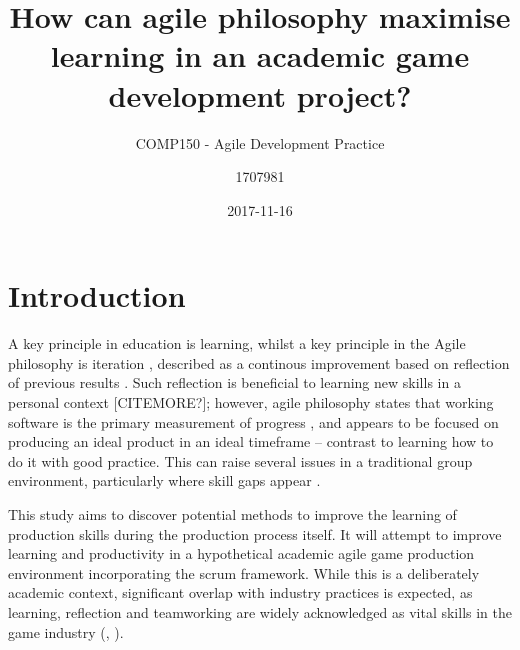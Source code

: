 \documentclass{scrartcl}
\title{How can agile philosophy maximise learning in an academic game development project?}
\subtitle{COMP150 - Agile Development Practice}
\date{2017-11-16}
\author{1707981}
\begin{document}
\maketitle
{}


\section{Introduction}
A key principle in education is learning, whilst a key principle in the Agile philosophy is iteration \cite{agile}, described as a continous improvement based on reflection of previous results \cite{iteration}. Such reflection is beneficial to learning new skills in a personal context \cite{learnreflection} [CITEMORE?]; however, agile philosophy states that working software is the primary measurement of progress \cite{manifesto}, and appears to be focused on producing an ideal product in an ideal timeframe -- contrast to learning how to do it with good practice. This can raise several issues in a traditional group environment, particularly where skill gaps appear \cite{group2003}.

This study aims to discover potential methods to improve the learning of production skills during the production process itself. It will attempt to improve learning and productivity in a hypothetical academic agile game production environment incorporating the scrum framework. While this is a deliberately academic context, significant overlap with industry practices is expected, as learning, reflection and teamworking are widely acknowledged as vital skills in the game industry (\cite{collaboration}, \cite{devstudy}).

\end{document}

